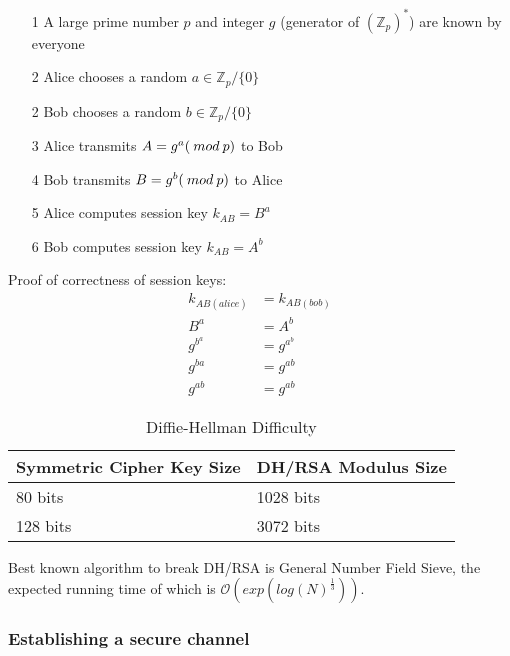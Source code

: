 \documentclass[a4paper]{article}
\begin{document}

\begin{enumerate}
  \item[1] A large prime number $p$ and integer $g$ (generator of
           $(\mathbb{Z}_{p})^{*}$) are known by everyone
  \item[2] Alice chooses a random $a \in \mathbb{Z}_{p} / \{0\}$
  \item[2] Bob chooses a random $b \in \mathbb{Z}_{p} / \{0\}$
  \item[3] Alice transmits $A = g^{a} (\: mod \: p)$ to Bob
  \item[4] Bob transmits $B = g^{b} (\: mod \: p)$ to Alice
  \item[5] Alice computes session key $k_{AB} = B^{a}$
  \item[6] Bob computes session key $k_{AB} = A^{b}$
\end{enumerate}


Proof of correctness of session keys:
\begin{align*}
  k_{AB(alice)} &= k_{AB(bob)} \\
          B^{a} &= A^{b} \\
      g^{b^{a}} &= g^{a^{b}} \\
         g^{ba} &= g^{ab} \\
         g^{ab} &= g^{ab}
\end{align*}


\begin{table}[h]
  \centering
  \begin{tabular}{@{}ll@{}}
    \toprule
    Symmetric Cipher Key Size & DH/RSA Modulus Size \\
    \midrule
    80 bits                   & 1028 bits           \\
    128 bits                  & 3072 bits           \\
    \bottomrule
  \end{tabular}
  \caption{Diffie-Hellman Difficulty}
  \label{tab:diffie_hellman_difficulty}
\end{table}
\FloatBarrier

Best known algorithm to break DH/RSA is General Number Field Sieve, the expected
running time of which is $\mathcal{O}(exp(log(N)^{\frac{1}{3}}))$.

\subsubsection{Establishing a secure channel}
\end{document}
